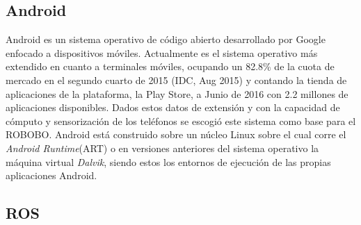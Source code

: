 \subsection{Android}
\label{subsec:android}


Android es un sistema operativo de código abierto desarrollado por Google enfocado a dispositivos móviles. Actualmente es el sistema operativo más extendido en cuanto a terminales móviles, ocupando un 82.8\% de la cuota de mercado en el segundo cuarto de 2015 (IDC, Aug 2015) y contando la tienda de aplicaciones de la plataforma, la  Play Store, a Junio de 2016 con 2.2 millones de aplicaciones disponibles.
Dados estos datos de extensión y con la capacidad de cómputo y sensorización de los teléfonos se escogió este sistema como base para el ROBOBO.
Android está construido sobre un núcleo Linux sobre el cual corre el \textit{Android Runtime}(ART) o en versiones anteriores del sistema operativo la máquina virtual \textit{Dalvik}, siendo estos los entornos de ejecución de las propias aplicaciones Android.


\subsection{ROS}
\label{subsec:ros}

